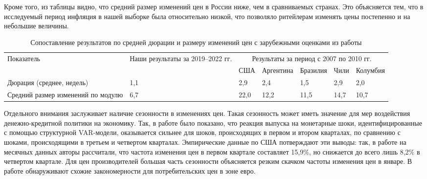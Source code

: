 Кроме того, из таблицы видно, что средний размер изменений цен в России ниже, чем в сравниваемых странах. Это объясняется тем, что в исследуемый период инфляция в нашей выборке была относительно низкой, что позволяло ритейлерам изменять цены постепенно и на небольшие величины.

\begin{table}[h]
	\centering
	\small %
	\caption{Сопоставление результатов по средней дюрации и размеру изменений цен с зарубежными оценками из работы \cite{cavallo2018scraped}}
	\label{tab:comparison}
	\begin{tabularx}{\textwidth}{|X|X|X|X|X|X|X|} %
		\hline
		Показатель & Наши результаты за 2019–2022 гг. & \multicolumn{5}{c|}{Результаты \cite{cavallo2018scraped} за период с 2007 по 2010 гг.} \\
		\cline{3-7}
		&  & США & Аргентина & Бразилия & Чили & Колумбия \\
		\hline
		Дюрация (среднее, недель) & 1,1 & 2,9 & 2,4 & 1,5 & 2,9 & 2,0 \\
		\hline
		Средний размер изменений по модулю & 6,7 & 22,0 & 12,2 & 11,5 & 14,7 & 10,7 \\
		\hline
	\end{tabularx}
\end{table}

% 

Отдельного внимания заслуживает наличие сезонности в изменениях цен. Такая сезонность может иметь значение для мер воздействия денежно-кредитной политики на экономику. Так, в работе \cite{olivei2007} было показано, что реакция выпуска на монетарные шоки, идентифицированные с помощью структурной VAR-модели, оказывается сильнее для шоков, происходящих в первом и втором кварталах, по сравнению с шоками, происходящими в третьем и четвертом кварталах. Эмпирические данные по США потверждают эти выводы: так, в работе \cite{Nakamura2008} на месячных данных авторы рассчитали, что частота изменения цен в первом квартале составляет 15,9\%, но снижается до всего лишь 8,2\% в четвертом квартале. Для цен производителей большая часть сезонности объясняется резким скачком частоты изменения цен в январе. В работе \cite{alvarez2006sticky} обнаруживают схожие закономерности для потребительских цен в зоне евро.

